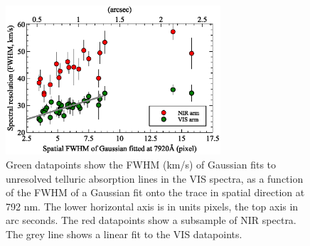 \documentclass{aa}    %
\begin{document}
\begin{figure}[!ht]
	\centerline{\includegraphics[width=8cm]{figures/resolution_paper.eps}}
	\caption{Green datapoints show the FWHM (km/s) of Gaussian fits to unresolved telluric absorption lines in the VIS spectra, as a function of the FWHM of a Gaussian fit onto the trace in spatial direction at  792 nm. The lower horizontal axis is in units pixels, the top axis in arc seconds. The red datapoints show a subsample of NIR spectra.
		The grey line shows a linear fit to the VIS datapoints. }
	\label{fig:res}
\end{figure}
\end{document}
